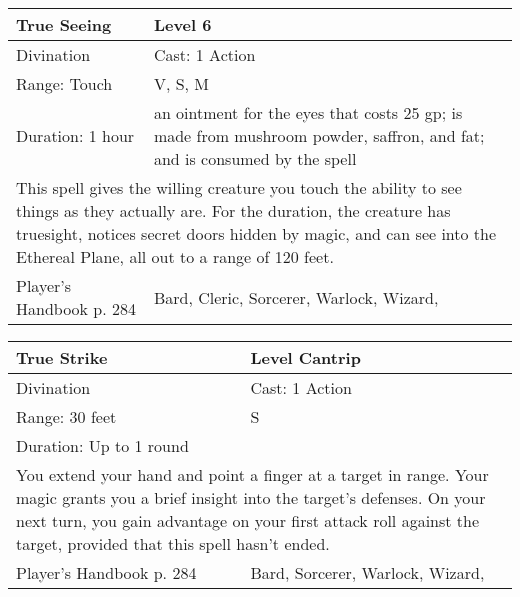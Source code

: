 \documentclass[11pt]{report}
\begin{document}
\begin{table}[H]
	\begin{tabular}{||p{6cm}|p{6cm}||}
		\hline\hline
		\bf{True Seeing} & Level 6\\ \hline
		Divination & Cast: 1 Action\\ \hline
		Range: Touch & V, S, M\\ \hline
		Duration: 1 hour & an ointment for the eyes that costs 25 gp; is made from mushroom powder, saffron, and fat; and is consumed by the spell\\ \hline
		\multicolumn{2}{||p{12cm}||}{This spell gives the willing creature you touch the ability to see things as they actually are. For the duration, the creature has truesight,  notices secret doors hidden by magic, and can see into the Ethereal Plane, all out to a range of 120 feet.}\\ \hline
Player's Handbook p. 284 & Bard, Cleric, Sorcerer, Warlock, Wizard, \\ \hline\hline
	\end{tabular}
\end{table}

\begin{table}[H]
	\begin{tabular}{||p{6cm}|p{6cm}||}
		\hline\hline
		\bf{True Strike} & Level Cantrip\\ \hline
		Divination & Cast: 1 Action\\ \hline
		Range: 30 feet & S\\ \hline
		Duration: Up to 1 round & \\ \hline
		\multicolumn{2}{||p{12cm}||}{You extend your hand and point a finger at a target in range. Your magic grants you a brief insight into the target’s defenses. On your next turn, you gain advantage on your first attack roll against the target, provided that this spell hasn’t ended.}\\ \hline
Player's Handbook p. 284 & Bard, Sorcerer, Warlock, Wizard, \\ \hline\hline
	\end{tabular}
\end{table}
\end{document}
